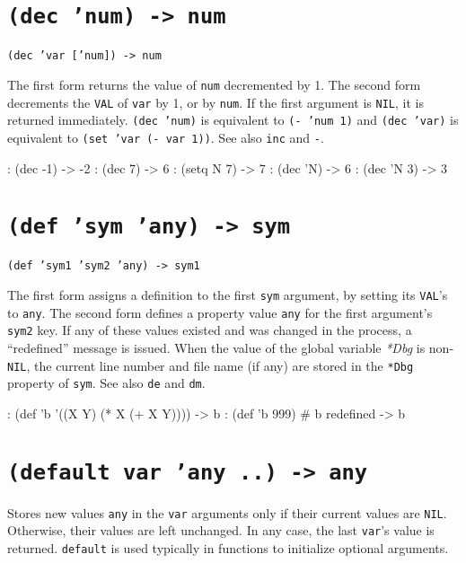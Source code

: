 { 
\section*{\texttt{(dec 'num) -> num}}
\label{sec:func-ref-D-(dec 'num) -> num}


\texttt{(dec 'var ['num]) -> num}

The first form returns the value of \texttt{num} decremented by 1. The second
form decrements the \texttt{VAL} of \texttt{var} by 1, or by \texttt{num}. If the first
argument is \texttt{NIL}, it is returned immediately. \texttt{(dec 'num)} is
equivalent to \texttt{(- 'num 1)} and \texttt{(dec 'var)} is equivalent to
\texttt{(set 'var (- var 1))}. See also \texttt{inc} and \texttt{-}.


\begin{wideverbatim}
: (dec -1)
-> -2
: (dec 7)
-> 6
: (setq N 7)
-> 7
: (dec 'N)
-> 6
: (dec 'N 3)
-> 3
\end{wideverbatim}

 
\section*{\texttt{(def 'sym 'any) -> sym}}
\label{sec:func-ref-D-(def 'sym 'any) -> sym}


\texttt{(def 'sym1 'sym2 'any) -> sym1}

The first form assigns a definition to the first \texttt{sym} argument, by
setting its \texttt{VAL}'s to \texttt{any}. The second form defines a property value
\texttt{any} for the first argument's \texttt{sym2} key. If any of these values
existed and was changed in the process, a ``redefined'' message is issued.
When the value of the global variable \emph{*Dbg} is
non-\texttt{NIL}, the current line number and file name (if any) are stored in
the \texttt{*Dbg} property of \texttt{sym}. See also \texttt{de} and \texttt{dm}.


\begin{wideverbatim}
: (def 'b '((X Y) (* X (+ X Y))))
-> b
: (def 'b 999)
# b redefined
-> b
\end{wideverbatim}

 
\section*{\texttt{(default var 'any ..) -> any}}
\label{sec:func-ref-D-(default var 'any ..) -> any}


Stores new values \texttt{any} in the \texttt{var} arguments only if their current
values are \texttt{NIL}. Otherwise, their values are left unchanged. In any
case, the last \texttt{var}'s value is returned. \texttt{default} is used typically in
functions to initialize optional arguments.


}
